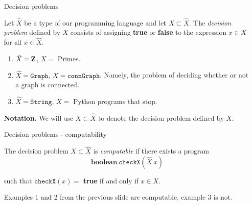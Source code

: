 %

\begin{frame}{Decision problems}
	\begin{defn}
		Let $\hat{X}$ be a type of our programming language and let
		$X \subset \hat{X}$. The \emph{decision problem} defined by $X$ consists
		of assigning \textbf{true} or \textbf{false} to the expression $x \in X$
		for all $x \in \hat{X}$. 
	\end{defn}

	\pause
	\begin{exl}
		\begin{enumerate}
			\item $\hat{X}= \mathbf{Z}$, $X=$ Primes.
			\item $\hat{X}= \mathtt{Graph}$, $X= \mathtt{connGraph}$. Namely,
				the problem of deciding whether or not a graph is
				connected.
			\item $\hat{X}= \mathtt{String}$, $X=$ Python programs that stop.
		\end{enumerate}
	\end{exl}

	\pause
	\textbf{Notation.} We will use $X \subset \hat{X}$ to denote the decision problem
	defined by $X$.
\end{frame}

%

\begin{frame}{Decision problems - computability}
	\begin{defn}
		The decision problem $X \subset \hat{X}$ is \emph{computable} if there
		exists a program
		\[
			\mathbf{boolean}\ \mathtt{checkX}(\hat{X}\ x)
		\]

		such that \(\mathtt{checkX}(x) =\) \textbf{true} if and only if
		$x \in X$.
	\end{defn}

	\pause
	\begin{exl}
		Examples 1 and 2 from the previous slide are computable, example 3 is
		not.
	\end{exl}
\end{frame}

%

